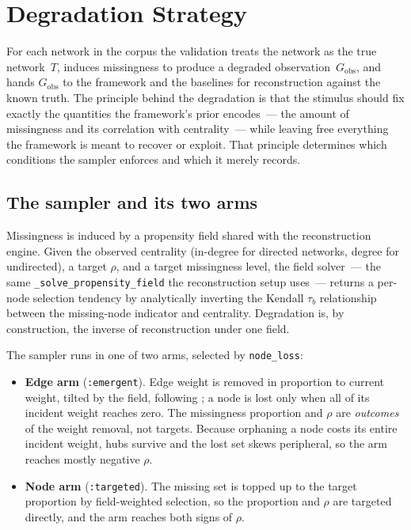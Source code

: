 \documentclass[11pt]{article}
\newcommand{\Gobs}{G_{\text{obs}}}
\begin{document}
\FloatBarrier

\section{Degradation Strategy}

For each network in the corpus the validation treats the network as the true network~$T$, induces missingness to produce a degraded observation~$\Gobs$, and hands $\Gobs$ to the framework and the baselines for reconstruction against the known truth. The principle behind the degradation is that the stimulus should fix exactly the quantities the framework's prior encodes~--- the amount of missingness and its correlation with centrality~--- while leaving free everything the framework is meant to recover or exploit. That principle determines which conditions the sampler enforces and which it merely records.

\subsection{The sampler and its two arms}

Missingness is induced by a propensity field shared with the reconstruction engine. Given the observed centrality (in-degree for directed networks, degree for undirected), a target $\rho$, and a target missingness level, the field solver~--- the same \texttt{\_solve\_propensity\_field} the reconstruction setup uses~--- returns a per-node selection tendency by analytically inverting the Kendall $\tau_b$ relationship between the missing-node indicator and centrality. Degradation is, by construction, the inverse of reconstruction under one field.

The sampler runs in one of two arms, selected by \texttt{node\_loss}:
\begin{itemize}[leftmargin=*, itemsep=3pt]
  \item \textbf{Edge arm} (\texttt{:emergent}). Edge weight is removed in proportion to current weight, tilted by the field, following \citet{Bellutta2026}; a node is lost only when all of its incident weight reaches zero. The missingness proportion and $\rho$ are \emph{outcomes} of the weight removal, not targets. Because orphaning a node costs its entire incident weight, hubs survive and the lost set skews peripheral, so the arm reaches mostly negative $\rho$.
  \item \textbf{Node arm} (\texttt{:targeted}). The missing set is topped up to the target proportion by field-weighted selection, so the proportion and $\rho$ are targeted directly, and the arm reaches both signs of $\rho$.
\end{itemize}
\end{document}
